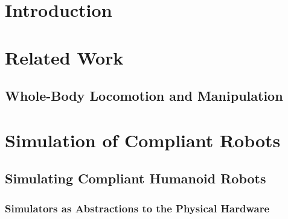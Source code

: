 \documentclass[%
	paper=A4,					%
	twoside=true,				%
	openright,			.
	parskip=full,				%
	chapterprefix=true,			%
	11pt,						%
	headings=normal,			%
	bibliography=totoc,			%
	listof=totoc,				%
	titlepage=on,				%
	captions=tableabove,		%
	draft=false,				%
]{scrreprt}%
\begin{document}

\pagestyle{empty}				%
\cleardoublepage

\pagestyle{plain}				%
\cleardoublepage
%
\cleardoublepage
%
\setcounter{tocdepth}{2}		%
\tableofcontents				%
\cleardoublepage

\setcounter{page}{1}			%
\pagestyle{maincontentstyle} 	%

\chapter{Introduction}

\chapter{Related Work}
\section{Whole-Body Locomotion and Manipulation}

\chapter{Simulation of Compliant Robots}

\section{Simulating Compliant Humanoid Robots}
\let\thefootnote\relax{}
\subsection{Simulators as Abstractions to the Physical Hardware}
\end{document}
